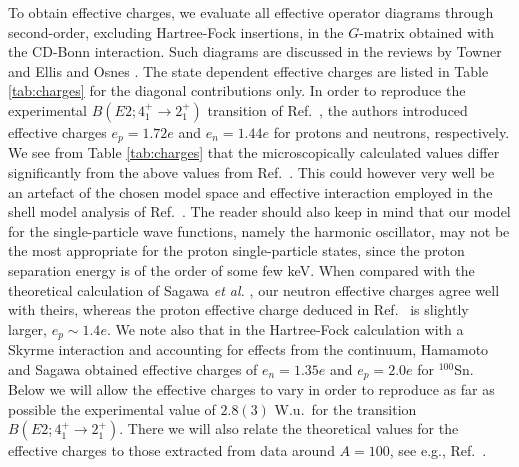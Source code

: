 \begin{multicols}{2}
To obtain effective charges, we 
evaluate all effective operator diagrams through second-order,
excluding Hartree-Fock insertions,  in the 
$G$-matrix obtained with  the CD-Bonn interaction. Such diagrams 
are discussed in the reviews by Towner \cite{towner87} 
and Ellis and Osnes \cite{eo77}.   
The state dependent effective charges are listed in Table
\ref{tab:charges} for the diagonal contributions only.
In order to reproduce the experimental $B(E2;4_1^+\rightarrow 2_1^+)$
transition of Ref.\ \cite{sb106}, the authors introduced 
effective charges $e_p=1.72e$ and
$e_n=1.44e$ for protons and neutrons, respectively.
We see from Table \ref{tab:charges} that the microscopically calculated
values differ significantly from the above values
from  Ref.\ \cite{sb106}. This
could however very well be an artefact of the chosen model space and 
effective interaction employed in the shell model analysis of
Ref.\ \cite{sb106}. The reader should also keep in mind that our
model for the single-particle wave functions, namely the 
harmonic oscillator, may not be the most appropriate for the proton
single-particle states, 
since the proton separation energy is of the order of some
few keV. 
When compared with the theoretical calculation of Sagawa {\em et al.} \cite{ssbw87},
our neutron effective charges agree well with theirs, whereas the proton effective charge
deduced in Ref.\ \cite{ssbw87} is slightly larger, $e_p\sim 1.4e$. We note also that in the 
Hartree-Fock calculation with a Skyrme interaction and 
accounting for effects from the continuum, 
Hamamoto and Sagawa \cite{hs97} obtained
effective charges of $e_n=1.35e$  and $e_p=2.0e$ for $^{100}$Sn. 
Below we will allow the effective charges
to vary in order to  reproduce as far as possible
the  experimental value of $2.8(3)$ W.u.\  for the transition 
$B(E2;4_1^+\rightarrow 2_1^+)$. There we will also relate the theoretical
values for the effective charges to those extracted from data
around $A=100$, see e.g., Ref.\ \cite{matej}.




\end{multicols}

